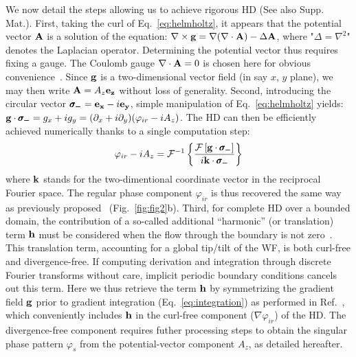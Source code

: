 \documentclass[10pt,twocolumn,twoside,letterpaper]{article}
\begin{document}
We now detail the steps allowing us to achieve rigorous HD (See also Supp. Mat.). 
%
First, taking the curl of Eq.~\eqref{eq:helmholtz}, it appears that the potential vector ${\bf A}$ is a solution of the equation: $\nabla\times {\bf g}=\nabla (\nabla\cdot {\bf A})-\Delta {\bf A}$, where "$\Delta =\nabla^2$" denotes the Laplacian operator. Determining the potential vector thus requires fixing a gauge. The Coulomb gauge $\nabla \cdot {\bf A}=0$ is chosen here for obvious convenience~\cite{Fried_JOSA_98,LeBigot_OL_99,Tyler_JOSA_2000}. Since ${\bf g}$ is a two-dimensional vector field (in say $x$, $y$ plane), we may then write ${\bf A}=A_z{\bf e_z}$ without loss of generality. 
Second, introducing the circular vector $\pmb{\sigma_-}={\bf e_x}-i{\bf e_y}$, simple manipulation of Eq.~\eqref{eq:helmholtz} yields: ${\bf g} \cdot \pmb{\sigma_-} = g_x+ig_y= (\partial_x+i\partial_y)(\varphi_{ir}-iA_z)$. The HD can then be efficiently achieved numerically thanks to a single computation step:
\begin{equation}
\varphi_{ir}-iA_z={\cal F}^{-1}\left\{ \frac{{\cal F}\left[{\bf g}\cdot \pmb{\sigma_-}\right]}{i{\bf k}\cdot \pmb{\sigma_-}}\right\}
\label{eq:integration}
\end{equation}
where ${\bf k}$ stands for the two-dimentional coordinate vector in the reciprocal Fourier space.
The regular phase component $\varphi_{ir}$ is thus recovered the same way as previously proposed~\cite{Huang2015,Bon_AO_12} (Fig.~\ref{fig:fig2}b).
Third, for complete HD over a bounded domain, the contribution of a so-called additional ``harmonic'' (or translation) term ${\bf h}$ must be considered when the flow through the boundary is not zero~\cite{Bremer_IEEE_13}. This translation term, accounting for a global tip/tilt of the WF, is both curl-free and divergence-free. If computing derivation and integration through discrete Fourier transforms without care, implicit periodic boundary conditions cancels out this term. Here we thus retrieve the term ${\bf h}$ by symmetrizing the gradient field ${\bf g}$ prior to gradient integration (Eq.~\eqref{eq:integration}) as performed in Ref.~\cite{Bon_AO_12}, which conveniently includes ${\bf h}$ in the curl-free component ($\nabla\varphi_{ir}$) of the HD.
The divergence-free component requires futher processing steps to obtain the singular phase pattern $\varphi_s$ from the potential-vector component $A_z$, as detailed hereafter.
\end{document}
